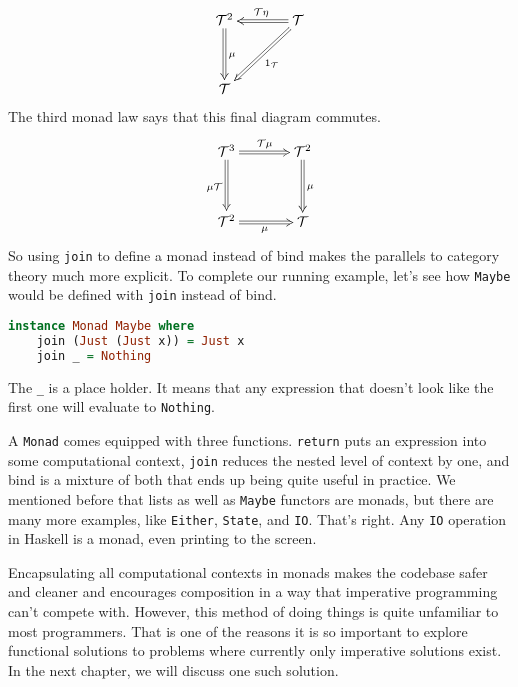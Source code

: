 \documentclass[MS, xcolor=dvipsnames]{wfuthesis}
\def\cT{\mathcal{T}}
\theoremstyle{definition}
\begin{document}
\[ \SelectTips{cm}{}\xymatrix@R+1pc@C+1pc{
  \cT^2 \ar@{=>}[d]^\mu & \cT \ar@{=>}[l]_{\cT\eta} \ar@{=>}[dl]^{1_\cT} \\ \cT &
} \]
The third monad law says that this final diagram commutes.
\[ \SelectTips{cm}{}\xymatrix@R+1pc@C+1pc{
  \cT^3 \ar@{=>}[r]^{\cT\mu} \ar@{=>}[d]_{\mu \cT} & \cT^2 \ar@{=>}[d]^\mu \\ \cT^2 \ar@{=>}[r]_\mu & \cT
} \]
So using \lstinline{join} to define a monad instead of bind makes the parallels to category theory much more explicit. To complete our running example, let's see how \lstinline{Maybe} would be defined with \lstinline{join} instead of bind.
\begin{lstlisting}[language=Haskell]
instance Monad Maybe where
    join (Just (Just x)) = Just x
    join _ = Nothing
\end{lstlisting}
The \lstinline{_} is a place holder. It means that any expression that doesn't look like the first one will evaluate to \lstinline{Nothing}. \par
A \lstinline{Monad} comes equipped with three functions. \lstinline{return} puts an expression into some computational context, \lstinline{join} reduces the nested level of context by one, and bind is a mixture of both that ends up being quite useful in practice. We mentioned before that lists as well as \lstinline{Maybe} functors are monads, but there are many more examples, like \lstinline{Either}, \lstinline{State}, and \lstinline{IO}. That's right. Any \lstinline{IO} operation in Haskell is a monad, even printing to the screen. \par
Encapsulating all computational contexts in monads makes the codebase safer and cleaner and encourages composition in a way that imperative programming can't compete with. However, this method of doing things is quite unfamiliar to most programmers. That is one of the reasons it is so important to explore functional solutions to problems where currently only imperative solutions exist. In the next chapter, we will discuss one such solution.

\end{document}
